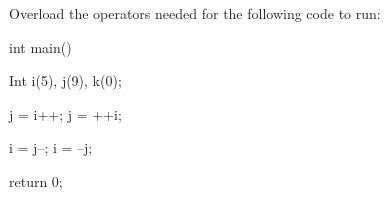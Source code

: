 Overload the operators needed for the following code to run:



\begin{consolethree}[escapeinside=||]

int main()

{

    Int i(5), j(9), k(0);

    j = i++; j = ++i;

    i = j--; i = --j;

    return 0;

}

\end{consolethree}

